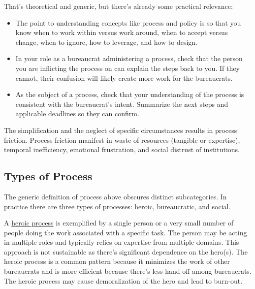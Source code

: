 That's theoretical and generic, but there's already some practical relevance:
\begin{itemize}
\item The point to understanding concepts like process and policy is so that you know when to work within versus work around, when to accept versus change, when to ignore, how to leverage, and how to design.
    \item In your role as a bureaucrat administering a process, check that the person you are inflicting the process on can explain the steps back to you. If they cannot, their confusion will likely create more work for the bureaucrats. 
    \item As the subject of a process, check that your understanding of the process is consistent with the bureaucrat's intent. Summarize the next steps and applicable deadlines so they can confirm. 
\end{itemize}

The simplification and the neglect of specific circumstances results in process friction. Process friction manifest in waste of resources (tangible or expertise), temporal inefficiency, emotional frustration, and social distrust of institutions.



\subsection{Types of Process}
The generic definition of process above obscures distinct subcategories. In practice there are three types of processes: heroic, bureaucratic, and social.

A \underline{heroic process} is exemplified by a single person or a very small number of people doing the work associated with a specific task. The person may be acting in multiple roles and typically relies on expertise from multiple domains. This approach is not sustainable as there's significant dependence on the hero(s). The heroic process is a common pattern because it minimizes the work of other bureaucrats and is more efficient because there's less hand-off among bureaucrats. The heroic process may cause demoralization of the hero and lead to burn-out. 


